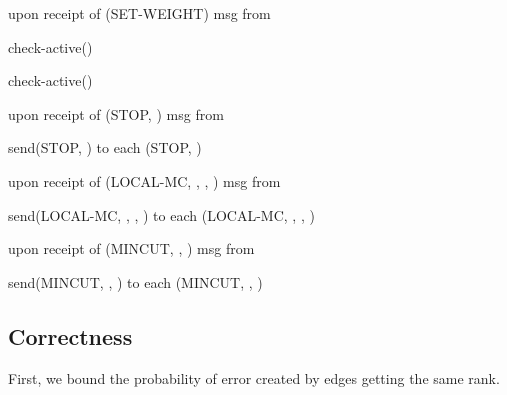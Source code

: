 \documentclass{acm_proc_article-sp}
\begin{document}
\begin{algorithm}                      \caption{upon receipt of (SET-WEIGHT) msg from }   \label{alg18}                           \begin{algorithmic}
\STATE 
\STATE check-active()
\end{algorithmic}
\end{algorithm}

\begin{algorithm}                      \caption{check-active()}   \label{alg19}                           \begin{algorithmic}
\IF{}
\STATE 
\ENDIF
\end{algorithmic}
\end{algorithm}

\begin{algorithm}                      \caption{upon receipt of (STOP, ) msg from }   \label{alg20}                           \begin{algorithmic}
\STATE{}
\IF{}
\STATE 
\STATE send(STOP, ) to each 
\STATE  (STOP, )
\ENDIF
\ENDIF
\end{algorithmic}
\end{algorithm}

\begin{algorithm}                      \caption{upon receipt of (LOCAL-MC, , , ) msg from }   \label{alg21}                           \begin{algorithmic}
\STATE{}
\IF{}
\STATE 
\ELSE
\STATE send(LOCAL-MC, , , ) to each 
\ENDIF
\STATE  (LOCAL-MC, , , )
\ENDIF
\end{algorithmic}
\end{algorithm}

\begin{algorithm}                      \caption{upon receipt of (MINCUT, , ) msg from }   \label{alg22}                           \begin{algorithmic}
\STATE{}
\STATE 
\STATE send(MINCUT, , ) to each 
\STATE  (MINCUT, , )
\ENDIF
\end{algorithmic}
\end{algorithm}


\subsection{Correctness}
First, we bound the probability of error created by edges getting the same rank.
\end{document}
